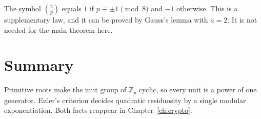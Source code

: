 \begin{remark}
The symbol $\left(\frac{2}{p}\right)$ equals $1$ if $p\equiv\pm1\pmod 8$ and $-1$ otherwise. This is a supplementary law, and it can be proved by Gauss's lemma with $a=2$. It is not needed for the main theorem here.
\end{remark}

\section{Summary}

Primitive roots make the unit group of $\mathbb{Z}_p$ cyclic, so every unit is a power of one generator. Euler's criterion decides quadratic residuosity by a single modular exponentiation. Both facts reappear in Chapter~\ref{ch:crypto}.
